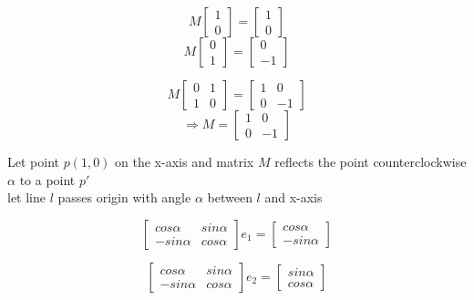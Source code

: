 \documentclass[10pt]{article}
\begin{document}
\[
        M \left[ 
        \begin{array}{c}
        1\\
        0    
        \end{array}
        \right] = 
        \left[
        \begin{array}{c}
        1 \\
        0
        \end{array}
        \right]
\]
\[
        M \left[ 
        \begin{array}{c}
        0\\
        1    
        \end{array}
        \right] = 
        \left[
        \begin{array}{c}
        0 \\
        -1 
        \end{array}
        \right]
\]

\[
        M \begin{bmatrix}
            0 & 1\\
            1 & 0 
        \end{bmatrix} = 
        \begin{bmatrix}
            1 & 0\\
            0 & -1 
        \end{bmatrix}
\]
\[
\Rightarrow 
        M = \begin{bmatrix}
            1 & 0\\
            0 & -1 
        \end{bmatrix}
\]

Let point $p(1, 0)$ on the x-axis and matrix $M$ reflects the point counterclockwise $\alpha$ to a point $p'$\\
let line $\mathit{l}$ passes origin with angle $\alpha$ between $\mathit{l}$ and x-axis

\[
    \begin{bmatrix}
        cos\alpha & sin\alpha\\
        -sin\alpha & cos\alpha   
    \end{bmatrix} e_{1} = 
    \left[
        \begin{array}{c}
            cos\alpha \\
            -sin\alpha
        \end{array}
    \right]
\]

\[
    \begin{bmatrix}
        cos\alpha & sin\alpha\\
        -sin\alpha & cos\alpha   
    \end{bmatrix} e_{2} = 
    \left[
        \begin{array}{c}
            sin\alpha \\
            cos\alpha
        \end{array}
    \right]
\]
\end{document}
